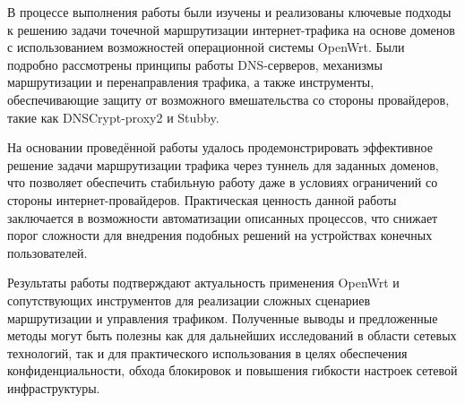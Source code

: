 \conclusion

В процессе выполнения работы были изучены и реализованы ключевые подходы к решению задачи точечной маршрутизации интернет-трафика на основе доменов с использованием возможностей операционной системы OpenWrt. Были подробно рассмотрены принципы работы DNS-серверов, механизмы маршрутизации и перенаправления трафика, а также инструменты, обеспечивающие защиту от возможного вмешательства со стороны провайдеров, такие как DNSCrypt-proxy2 и Stubby.

На основании проведённой работы удалось продемонстрировать эффективное решение задачи маршрутизации трафика через туннель для заданных доменов, что позволяет обеспечить стабильную работу даже в условиях ограничений со стороны интернет-провайдеров. Практическая ценность данной работы заключается в возможности автоматизации описанных процессов, что снижает порог сложности для внедрения подобных решений на устройствах конечных пользователей.

Результаты работы подтверждают актуальность применения OpenWrt и сопутствующих инструментов для реализации сложных сценариев маршрутизации и управления трафиком. Полученные выводы и предложенные методы могут быть полезны как для дальнейших исследований в области сетевых технологий, так и для практического использования в целях обеспечения конфиденциальности, обхода блокировок и повышения гибкости настроек сетевой инфраструктуры.
